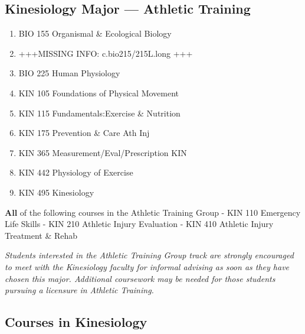 \documentclass[
  letterpaper,
]{scrbook}
\providecommand{\tightlist}{%
  \setlength{\itemsep}{0pt}\setlength{\parskip}{0pt}}
\begin{document}
\subsection{Kinesiology Major --- Athletic
Training}\label{kinesiology-major-athletic-training}

\begin{enumerate}
\def\labelenumi{\arabic{enumi}.}
\tightlist
\item
  BIO 155 Organismal \& Ecological Biology
\item
  +++MISSING INFO: c.bio215/215L.long +++
\item
  BIO 225 Human Physiology
\item
  KIN 105 Foundations of Physical Movement
\item
  KIN 115 Fundamentals:Exercise \& Nutrition
\item
  KIN 175 Prevention \& Care Ath Inj
\item
  KIN 365 Measurement/Eval/Prescription KIN
\item
  KIN 442 Physiology of Exercise
\item
  KIN 495 Kinesiology
\end{enumerate}

\textbf{All} of the following courses in the Athletic Training Group -
KIN 110 Emergency Life Skills - KIN 210 Athletic Injury Evaluation - KIN
410 Athletic Injury Treatment \& Rehab

\emph{Students interested in the Athletic Training Group track are
strongly encouraged to meet with the Kinesiology faculty for informal
advising as soon as they have chosen this major. Additional coursework
may be needed for those students pursuing a licensure in Athletic
Training. }

\subsection{Courses in Kinesiology}\label{courses-in-kinesiology}
\end{document}
